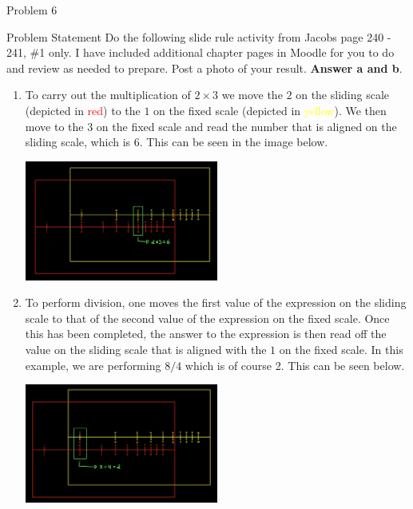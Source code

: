 \begin{problem}{Problem 6}
    \begin{statement}{Problem Statement}
        Do the following slide rule activity from Jacobs page 240 - 241, \#1 only. I have included additional chapter pages in Moodle for you to do and review as needed to prepare. Post a photo of your 
        result. \textbf{Answer a and b}.

    \end{statement}

    \begin{Highlight}[Solution]
        \begin{enumerate}[label=(\alph*)]
            \item To carry out the multiplication of $2 \times 3$ we move the $2$ on the sliding scale (depicted in \textcolor{red}{red}) to the $1$ on the fixed scale (depicted in \textcolor{yellow}{yellow}).
            We then move to the $3$ on the fixed scale and read the number that is aligned on the sliding scale, which is $6$. This can be seen in the image below.
            \begin{center}
                \includegraphics[width = 0.5\textwidth]{./Images/Slide Rule Multiplication.png}
            \end{center}
            \item To perform division, one moves the first value of the expression on the sliding scale to that of the second value of the expression on the fixed scale. Once this has been completed, the answer
            to the expression is then read off the value on the sliding scale that is aligned with the $1$ on the fixed scale. In this example, we are performing $8 / 4$ which is of course 2. This can be seen below.
            \begin{center}
                \includegraphics[width = 0.5\textwidth]{./Images/Slide Rule Division.png}
            \end{center}
        \end{enumerate}
    \end{Highlight}
\end{problem}

